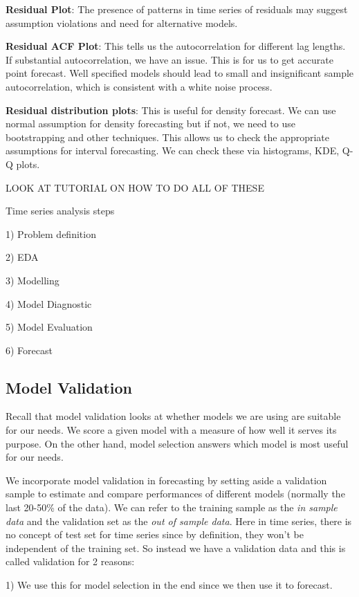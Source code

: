\documentclass[11pt, oneside]{article}
\theoremstyle{definition}
\begin{document}
\textbf{Residual Plot}: The presence of patterns in time series of residuals may suggest assumption violations and need for alternative models.

\textbf{Residual ACF Plot}: This tells us the autocorrelation for different lag lengths. If substantial autocorrelation, we have an issue. This is for us to get accurate point forecast. Well specified models should lead to small and insignificant sample autocorrelation, which is consistent with a white noise process.

\textbf{Residual distribution plots}: This is useful for density forecast. We can use normal assumption for density forecasting but if not, we need to use bootstrapping and other techniques. This allows us to check the appropriate assumptions for interval forecasting. We can check these via histograms, KDE, Q-Q plots.

LOOK AT TUTORIAL ON HOW TO DO ALL OF THESE

Time series analysis steps
\begin{center}
  1) Problem definition

  2) EDA

  3) Modelling

  4) Model Diagnostic

  5) Model Evaluation

  6) Forecast
\end{center}

\subsection{Model Validation}
Recall that model validation looks at whether models we are using are suitable for our needs. We score a given model with a measure of how well it serves its purpose. On the other hand, model selection answers which model is most useful for our needs.

We incorporate model validation in forecasting by setting aside a validation sample to estimate and compare performances of different models (normally the last 20-50\% of the data). We can refer to the training sample as the \textit{in sample data} and the validation set as the \textit{out of sample data}. Here in time series, there is no concept of test set for time series since by definition, they won't be independent of the training set. So instead we have a validation data and this is called validation for 2 reasons:

1) We use this for model selection in the end since we then use it to forecast.
\end{document}
